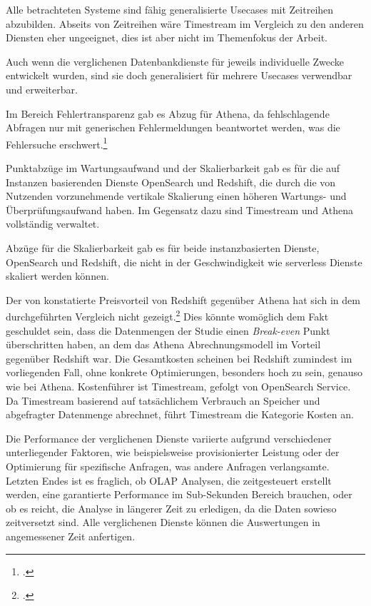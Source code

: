 Alle betrachteten Systeme sind fähig generalisierte Usecases mit Zeitreihen abzubilden. Abseits von Zeitreihen wäre Timestream im Vergleich zu den anderen Diensten eher ungeeignet, dies ist aber nicht im Themenfokus der Arbeit. 

Auch wenn die verglichenen Datenbankdienste für jeweils individuelle Zwecke entwickelt wurden, sind sie doch generalisiert für mehrere Usecases verwendbar und erweiterbar.

Im Bereich Fehlertransparenz gab es Abzug für Athena, da fehlschlagende Abfragen nur mit generischen Fehlermeldungen beantwortet werden, was die Fehlersuche erschwert.\footcite[Vgl.][]{Cooney.2020}

Punktabzüge im Wartungsaufwand und der Skalierbarkeit gab es für die auf Instanzen basierenden Dienste OpenSearch und Redshift, die durch die von Nutzenden vorzunehmende vertikale Skalierung einen höheren Wartungs- und Überprüfungsaufwand haben. Im Gegensatz dazu sind Timestream und Athena vollständig verwaltet.

Abzüge für die Skalierbarkeit gab es für beide instanzbasierten Dienste, OpenSearch und Redshift, die nicht in der Geschwindigkeit wie serverless Dienste skaliert werden können.

Der von \citeauthor{Tan.2019} konstatierte Preisvorteil von Redshift gegenüber Athena hat sich in dem durchgeführten Vergleich nicht gezeigt.\footcite[Vgl.][2178\psq]{Tan.2019} Dies könnte womöglich dem Fakt geschuldet sein, dass die Datenmengen der Studie einen \textit{Break-even} Punkt überschritten haben, an dem das Athena Abrechnungsmodell im Vorteil gegenüber Redshift war.
Die Gesamtkosten scheinen bei Redshift zumindest im vorliegenden Fall, ohne konkrete Optimierungen, besonders hoch zu sein, genauso wie bei Athena. Kostenführer ist Timestream, gefolgt von OpenSearch Service. Da Timestream basierend auf tatsächlichem Verbrauch an Speicher und abgefragter Datenmenge abrechnet, führt Timestream die Kategorie Kosten an.

Die Performance der verglichenen Dienste variierte aufgrund verschiedener unterliegender Faktoren, wie beispielsweise provisionierter Leistung oder der Optimierung für spezifische Anfragen, was andere Anfragen verlangsamte. Letzten Endes ist es fraglich, ob \ac{OLAP} Analysen, die zeitgesteuert erstellt werden, eine garantierte Performance im Sub-Sekunden Bereich brauchen, oder ob es reicht, die Analyse in längerer Zeit zu erledigen, da die Daten sowieso zeitversetzt sind.
Alle verglichenen Dienste können die Auswertungen in angemessener Zeit anfertigen. 

